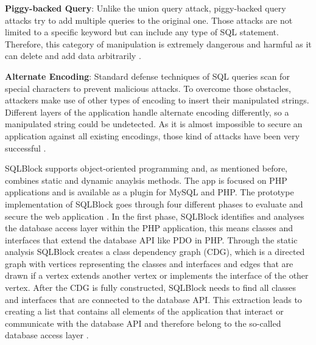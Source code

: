 \textbf{Piggy-backed Query}: Unlike the union query attack, piggy-backed query attacks try to add multiple queries to the original one. Those attacks are not limited to a specific keyword but can include any type of SQL statement. Therefore, this category of manipulation is extremely dangerous and harmful as it can delete and add data arbitrarily \autocite[4]{Halfond2008}.\newline


\textbf{Alternate Encoding}: Standard defense techniques of SQL queries scan for special characters to prevent malicious attacks. To overcome those obstacles, attackers make use of other types of encoding to insert their manipulated strings. Different layers of the application handle alternate encoding differently, so a manipulated string could be undetected. As it is almost impossible to secure an application against all existing encodings, those kind of attacks have been very successful \autocite[5]{Halfond2008}.\newline

SQLBlock supports object-oriented programming and, as mentioned before, combines static and dynamic anaylsis methods. The app is focused on PHP applications and is available as a plugin for MySQL and PHP. The prototype implementation of SQLBlock goes through four different phases to evaluate and secure the web application \autocite[1, 5]{Jahanshahi2018}.\newline
In the first phase, SQLBlock identifies and analyses the database access layer within the PHP application, this means classes and interfaces that extend the database API like PDO in PHP. Through the static analysis SQLBlock creates a class dependency graph (CDG), which is a directed graph with vertices representing the classes and interfaces and edges that are drawn if a vertex extends another vertex or implements the interface of the other vertex. After the CDG is fully constructed, SQLBlock needs to find all classes and interfaces that are connected to the database API. This extraction leads to creating a list that contains all elements of the application that interact or communicate with the database API and therefore belong to the so-called database access layer \autocite[3, 6]{Jahanshahi2018}.\newline


